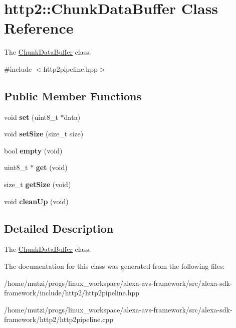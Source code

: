 \hypertarget{classhttp2_1_1ChunkDataBuffer}{}\section{http2\+:\+:Chunk\+Data\+Buffer Class Reference}
\label{classhttp2_1_1ChunkDataBuffer}


The \hyperlink{classhttp2_1_1ChunkDataBuffer}{Chunk\+Data\+Buffer} class.  




{\ttfamily \#include $<$http2pipeline.\+hpp$>$}

\subsection*{Public Member Functions}
\begin{DoxyCompactItemize}
\item 
\mbox{\label{classhttp2_1_1ChunkDataBuffer_a236308ca763a93b1329f1022eb1d99a9}} 
void {\bfseries set} (uint8\+\_\+t $\ast$data)
\item 
\mbox{\label{classhttp2_1_1ChunkDataBuffer_abd2986050697eca6ff0146984ba74b97}} 
void {\bfseries set\+Size} (size\+\_\+t size)
\item 
\mbox{\label{classhttp2_1_1ChunkDataBuffer_adf508af71ee595095cfa1fc89b29e014}} 
bool {\bfseries empty} (void)
\item 
\mbox{\label{classhttp2_1_1ChunkDataBuffer_afb5ff38c994ac685b6f4d203eb14e352}} 
uint8\+\_\+t $\ast$ {\bfseries get} (void)
\item 
\mbox{\label{classhttp2_1_1ChunkDataBuffer_a0334c52335804f1db63c8c82d812fedb}} 
size\+\_\+t {\bfseries get\+Size} (void)
\item 
\mbox{\label{classhttp2_1_1ChunkDataBuffer_a6df63bcb799b618e27b40d49a04e256b}} 
void {\bfseries clean\+Up} (void)
\end{DoxyCompactItemize}


\subsection{Detailed Description}
The \hyperlink{classhttp2_1_1ChunkDataBuffer}{Chunk\+Data\+Buffer} class. 

The documentation for this class was generated from the following files\+:\begin{DoxyCompactItemize}
\item 
/home/mutzi/progs/linux\+\_\+workspace/alexa-\/avs-\/framework/src/alexa-\/sdk-\/framework/include/http2/http2pipeline.\+hpp\item 
/home/mutzi/progs/linux\+\_\+workspace/alexa-\/avs-\/framework/src/alexa-\/sdk-\/framework/http2/http2pipeline.\+cpp\end{DoxyCompactItemize}
